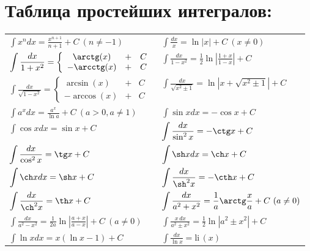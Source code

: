 \documentclass[12pt, a4paper]{article}
\begin{document}
\section{Таблица простейших интегралов:}
\begin{tabular}{ll}
$\displaystyle \int{x^ndx} = \frac{x^{n+1}}{n+1} + C \ (n\neq-1) $ &
$\displaystyle \int{\frac{dx}{x}}=\ln |x| + C \ (x\neq0)         $ \\
$\displaystyle \int{\frac{dx}{1+x^2}} = \left\{\begin{array}{ccc} \arctg (x) & + & C \\-\arcctg(x) & + & C
\end{array}\right. $ & 
$\displaystyle \int{\frac{dx}{1-x^2}} = \frac{1}{2} \ln \left| \frac{1+x}{1-x} \right| + C $ \\
$\displaystyle \int{\frac{dx}{\sqrt{1-x^2}}} = \left\{ \begin{array}{ccc} \arcsin (x) & + & C \\ -\arccos(x) & + & C \end{array}\right. $ &
$\displaystyle \int{\frac{dx}{\sqrt{x^2\pm1}}} = \ln \left|x+\sqrt{x^2\pm1} \right| + C$ \\
$\displaystyle \int{a^x dx} = \frac{a^x}{\ln a} + C \ (a>0,a\neq1)$ &
$\displaystyle \int{\sin x dx} = -\cos x + C $ \\
$\displaystyle \int{\cos x dx} = \sin x + C $ &
$\displaystyle \int{\frac{dx}{\sin^2x}} = -\ctg x + C $ \\
$\displaystyle \int{\frac{dx}{\cos^2x}} = \tg x + C $ &  
$\displaystyle \int{\sh x dx} = \ch x + C $ \\
$\displaystyle \int{\ch x dx} = \sh x + C $ &
$\displaystyle \int{\frac{dx}{\sh^2x}} = -\cth x + C $ \\
$\displaystyle \int{\frac{dx}{\ch^2x}} = \th x + C $ & 
$\displaystyle \int{\frac{dx}{a^2+x^2}} = \frac{1}{a}  \arctg \frac{x}{a} + C \ (a\neq0) $ \\
$\displaystyle \int{\frac{dx}{a^2-x^2}} = \frac{1}{2a} \ln \left|\frac{a+x}{a-x}\right| + C \ (a\neq0) $ &
$\displaystyle \int{\frac{x\,dx}{a^2\pm x^2}} = \frac{1}{2} \ln \left|a^2\pm x^2\right| + C $ \\
$\displaystyle \int{\ln x dx} = x(\ln x - 1) + C$ &
$\displaystyle \int{\frac{dx}{\ln x}} = \text{li}\,(x)$ \\
\end{tabular} 
\par \- \newline
\par \- \newline
\end{document}
